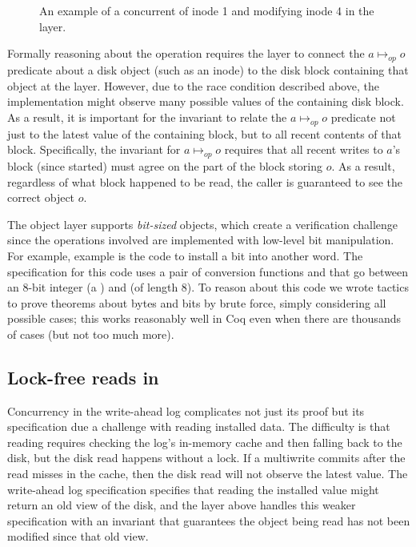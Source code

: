 \begin{figure}[ht]
\centering

\caption{An example of a concurrent  of inode 1 and 
  modifying inode 4
  in the  layer.}
\label{fig:txn-concur}
\end{figure}

Formally reasoning about the  operation requires the 
layer to connect the $a \mapsto_{\mathit{op}} o$ predicate about a disk object
(such as an inode) to the disk block containing that object at the
 layer.  However, due to the race condition described above,
the  implementation might observe many possible values of the
containing disk block.  As a result, it is important for the 
invariant to relate the $a \mapsto_{\mathit{op}} o$ predicate not just to
the latest value of the containing block, but to all recent contents
of that block.  Specifically, the invariant for $a \mapsto_{\mathit{op}} o$
requires that all recent writes to $a$'s block (since 
started) must agree on the part of the block storing $o$.  As a result,
regardless of what block happened to be read,
the caller is guaranteed to see the correct object $o$.

The object layer supports \emph{bit-sized} objects, which create a verification
challenge since the operations involved are implemented with low-level bit manipulation. For example,
example is the code to install a bit into another word. The specification for
this code uses a
pair of conversion functions  and  that go
between an 8-bit integer (a ) and  (of length 8). To reason
about this code we wrote tactics to prove theorems about bytes and bits by brute
force, simply considering all possible cases; this works reasonably well in Coq
even when there are thousands of cases (but not too much more).

\subsection[Lock-free reads in WAL]{Lock-free reads in }
\label{sec:txn:wal-read}

Concurrency in the write-ahead log complicates not just its proof but its
specification due a challenge with reading installed data. The difficulty is that
reading requires checking the log's in-memory cache and then falling back to the disk,
but the disk read happens without a lock. If a multiwrite commits after the read
misses in the cache, then the disk read will not observe the latest value. The
write-ahead log specification specifies that reading the installed value might return an
old view of the disk, and the  layer above handles this weaker specification with
an invariant that guarantees the object being read has not been modified since
that old view.

